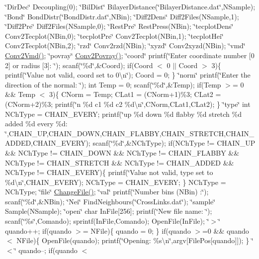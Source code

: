 \char`\"{}\+Dir\+Dec\char`\"{} Decoupling(0); \char`\"{}\+Bil\+Dist\char`\"{} Bilayer\+Distance(\char`\"{}\+Bilayer\+Distance.\+dat\char`\"{},N\+Sample); \char`\"{}\+Bond\char`\"{} Bond\+Distr(\char`\"{}\+Bond\+Distr.\+dat\char`\"{},N\+Bin); \char`\"{}\+Diff2\+Dens\char`\"{} Diff2\+Files(\+N\+Sample,1); \char`\"{}\+Diff2\+Pre\char`\"{} Diff2\+Files(\+N\+Sample,0); \char`\"{}\+Rest\+Pre\char`\"{} Rest\+Press(\+N\+Bin); \char`\"{}tecplot\+Dens\char`\"{} Conv2\+Tecplot(\+N\+Bin,0); \char`\"{}tecplot\+Pre\char`\"{} Conv2\+Tecplot(\+N\+Bin,1); \char`\"{}tecplot\+Hei\char`\"{} Conv2\+Tecplot(\+N\+Bin,2); \char`\"{}rzd\char`\"{} Conv2rzd(\+N\+Bin); \char`\"{}xyzd\char`\"{} Conv2xyzd(\+N\+Bin); \char`\"{}vmd\char`\"{} \hyperlink{classElPoly_a552193e7b9dea6d667fc1cd2ecab1482}{Conv2\+Vmd()}; \char`\"{}povray\char`\"{} \hyperlink{classElPoly_ac2e836951a966bd69b21705cad363b95}{Conv2\+Povray()}; \char`\"{}coord\char`\"{} printf(\char`\"{}\+Enter coordinate number \mbox{[}0 2\mbox{]} or radius \mbox{[}3\mbox{]}\+: \char`\"{}); scanf(\char`\"{}\%d\char`\"{},\&Coord); if(Coord $<$ 0 $\vert$$\vert$ Coord $>$ 3)\{ printf(\char`\"{}\+Value not valid, coord set to 0\textbackslash{}n\char`\"{}); Coord = 0; \} \char`\"{}norm\char`\"{} printf(\char`\"{}\+Enter the direction of the normal\+: \char`\"{}); int Temp = 0; scanf(\char`\"{}\%d\char`\"{},\&Temp); if(Temp $>$= 0 \&\& Temp $<$ 3)\{ C\+Norm = Temp; C\+Lat1 = (C\+Norm+1)\%3; C\+Lat2 = (C\+Norm+2)\%3; printf(\char`\"{}n \%d c1 \%d c2 \%d\textbackslash{}n\char`\"{},C\+Norm,C\+Lat1,C\+Lat2); \} \char`\"{}type\char`\"{} int N\+Ch\+Type = C\+H\+A\+I\+N\+\_\+\+E\+V\+E\+RY; printf(\char`\"{}up \%d down \%d flabby \%d stretch \%d added \%d every \%d\+: \char`\"{},C\+H\+A\+I\+N\+\_\+\+UP,C\+H\+A\+I\+N\+\_\+\+D\+O\+WN,C\+H\+A\+I\+N\+\_\+\+F\+L\+A\+B\+BY,C\+H\+A\+I\+N\+\_\+\+S\+T\+R\+E\+T\+CH,C\+H\+A\+I\+N\+\_\+\+A\+D\+D\+ED,C\+H\+A\+I\+N\+\_\+\+E\+V\+E\+RY); scanf(\char`\"{}\%d\char`\"{},\&N\+Ch\+Type); if(N\+Ch\+Type != C\+H\+A\+I\+N\+\_\+\+UP \&\& N\+Ch\+Type != C\+H\+A\+I\+N\+\_\+\+D\+O\+WN \&\& N\+Ch\+Type != C\+H\+A\+I\+N\+\_\+\+F\+L\+A\+B\+BY \&\& N\+Ch\+Type != C\+H\+A\+I\+N\+\_\+\+S\+T\+R\+E\+T\+CH \&\& N\+Ch\+Type != C\+H\+A\+I\+N\+\_\+\+A\+D\+D\+ED \&\& N\+Ch\+Type != C\+H\+A\+I\+N\+\_\+\+E\+V\+E\+RY)\{ printf(\char`\"{}\+Value not valid, type set to \%d\textbackslash{}n\char`\"{},C\+H\+A\+I\+N\+\_\+\+E\+V\+E\+RY); N\+Ch\+Type = C\+H\+A\+I\+N\+\_\+\+E\+V\+E\+RY; \} N\+Ch\+Type = N\+Ch\+Type; \char`\"{}file\char`\"{} \hyperlink{classElPoly_a5fa485410c0b7e02f523f96f33504435}{Change\+File()}; \char`\"{}val\char`\"{} printf(\char`\"{}\+Number bins (\+N\+Bin) \+:\char`\"{}); scanf(\char`\"{}\%d\char`\"{},\&N\+Bin); \char`\"{}\+Nei\char`\"{} Find\+Neighbours(\char`\"{}\+Cross\+Links.\+dat\char`\"{}); \char`\"{}sample\char`\"{} Sample(\+N\+Sample); \char`\"{}open\char`\"{} char In\+File\mbox{[}256\mbox{]}; printf(\char`\"{}\+New file name\+: \char`\"{}); scanf(\char`\"{}\%s\char`\"{},Comando); sprintf(\+In\+File,\+Comando); Open\+File(\+In\+File); \char`\"{}$>$\char`\"{} quando++; if(quando $>$= N\+File)\{ quando = 0; \} if(quando $>$=0 \&\& quando $<$ N\+File)\{ Open\+File(quando); printf(\char`\"{}\+Opening\+: \%s\textbackslash{}n\char`\"{},argv\mbox{[}File\+Pos\mbox{[}quando\mbox{]}\mbox{]}); \} \char`\"{}$<$\char`\"{} quando--; if(quando $<$ 